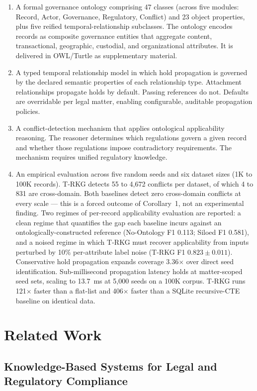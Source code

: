 \documentclass{ieeeaccess}
\begin{document}
\begin{enumerate}
    \item A formal governance ontology comprising 47 classes (across five modules: Record, Actor, Governance, Regulatory, Conflict) and 23 object properties, plus five reified temporal-relationship subclasses. The ontology encodes records as composite governance entities that aggregate content, transactional, geographic, custodial, and organizational attributes. It is delivered in OWL/Turtle as supplementary material.
    \item A typed temporal relationship model in which hold propagation is governed by the declared semantic properties of each relationship type. Attachment relationships propagate holds by default. Passing references do not. Defaults are overridable per legal matter, enabling configurable, auditable propagation policies.
    \item A conflict-detection mechanism that applies ontological applicability reasoning. The reasoner determines which regulations govern a given record and whether those regulations impose contradictory requirements. The mechanism requires unified regulatory knowledge.
    \item An empirical evaluation across five random seeds and six dataset sizes (1K to 100K records). T-RKG detects 55 to 4{,}672 conflicts per dataset, of which 4 to 831 are cross-domain. Both baselines detect zero cross-domain conflicts at every scale --- this is a forced outcome of Corollary~1, not an experimental finding. Two regimes of per-record applicability evaluation are reported: a clean regime that quantifies the gap each baseline incurs against an ontologically-constructed reference (No-Ontology F1 0.113; Siloed F1 0.581), and a noised regime in which T-RKG must recover applicability from inputs perturbed by 10\% per-attribute label noise (T-RKG F1 $0.823 \pm 0.011$). Conservative hold propagation expands coverage 3.36$\times$ over direct seed identification. Sub-millisecond propagation latency holds at matter-scoped seed sets, scaling to 13.7~ms at 5{,}000 seeds on a 100K corpus. T-RKG runs 121$\times$ faster than a flat-list and 406$\times$ faster than a SQLite recursive-CTE baseline on identical data.
\end{enumerate}

\section{Related Work}

\subsection{Knowledge-Based Systems for Legal and Regulatory Compliance}
\end{document}
